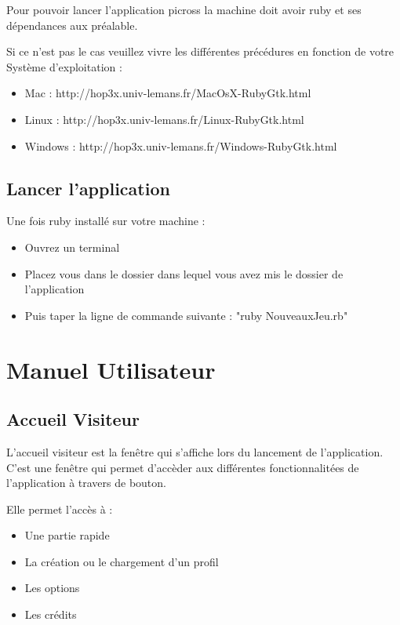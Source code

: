\documentclass[11pt]{article}
\begin{document}
Pour pouvoir lancer l'application picross la machine doit avoir ruby et ses dépendances aux préalable.

Si ce n'est pas le cas veuillez vivre les différentes précédures en fonction de votre Système d'exploitation :

	\begin{itemize}
		\item Mac : http://hop3x.univ-lemans.fr/MacOsX-RubyGtk.html
		\item Linux : http://hop3x.univ-lemans.fr/Linux-RubyGtk.html
		\item Windows : http://hop3x.univ-lemans.fr/Windows-RubyGtk.html
	\end{itemize}

\subsection{Lancer l'application}

Une fois ruby installé sur votre machine : 
	
	\begin{itemize}
		\item Ouvrez un terminal
		\item Placez vous dans le dossier dans lequel vous avez mis le dossier de l'application
		\item Puis taper la ligne de commande suivante : "ruby NouveauxJeu.rb"
	\end{itemize}


\newpage


\section{Manuel Utilisateur}


\subsection{Accueil Visiteur}

L'accueil visiteur est la fenêtre qui s'affiche lors du lancement de l'application. C'est une fenêtre qui permet d'accèder aux différentes fonctionnalitées de l'application à travers de bouton.

Elle permet l'accès à :

	\begin{itemize}
		\item Une partie rapide
		\item La création ou le chargement d'un profil
		\item Les options
		\item Les crédits
	\end{itemize}
\end{document}

